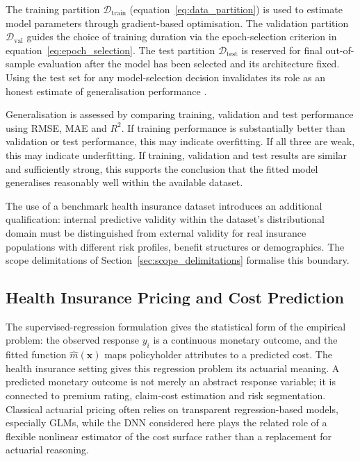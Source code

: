 \noindent
The training partition \(\mathcal{D}_{\mathrm{train}}\)
(equation~\eqref{eq:data_partition}) is used to estimate model parameters through
gradient-based optimisation. The validation partition
\(\mathcal{D}_{\mathrm{val}}\) guides the choice of training duration via
the epoch-selection criterion in equation~\eqref{eq:epoch_selection}. The test partition
\(\mathcal{D}_{\mathrm{test}}\) is reserved for final out-of-sample evaluation
after the model has been selected and its architecture fixed. Using the test set
for any model-selection decision invalidates its role as an honest estimate of
generalisation performance
\citep{hastie2009elements,abu2012learning}.

\noindent
Generalisation is assessed by comparing training, validation and test
performance using RMSE, MAE and \ensuremath{R^2}. If
training performance is substantially better than validation or test
performance, this may indicate overfitting. If all three are weak, this may
indicate underfitting. If training, validation and test results are similar and
sufficiently strong, this supports the conclusion that the fitted model
generalises reasonably well within the available dataset.

\noindent
The use of a benchmark health insurance dataset introduces an additional
qualification: internal predictive validity within the dataset's
distributional domain must be distinguished from external validity for
real insurance populations with different risk profiles, benefit
structures or demographics.  The scope delimitations of
Section~\ref{sec:scope_delimitations} formalise this boundary.

\newpage

\subsection{Health Insurance Pricing and Cost Prediction}
\label{sec:health_insurance_pricing_cost_prediction}

\noindent
The supervised-regression formulation gives the
statistical form of the empirical problem: the observed response \(y_i\) is a
continuous monetary outcome, and the fitted function
\(\widehat{m}(\mathbf{x})\) maps policyholder attributes to a predicted cost.
The health insurance setting gives this regression problem its actuarial
meaning. A predicted monetary outcome is not merely an abstract response
variable; it is connected to premium rating, claim-cost estimation and risk
segmentation. Classical actuarial pricing often relies on transparent
regression-based models, especially GLMs, while the
DNN considered here plays the related role of a flexible nonlinear
estimator of the cost surface rather than a replacement for actuarial reasoning.

